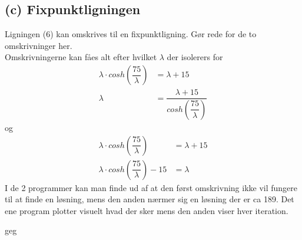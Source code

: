 \subsection*{(c) Fixpunktligningen}
 Ligningen (6) kan omskrives til en fixpunktligning. Gør rede for de to omskrivninger her.\\
Omskrivningerne kan fåes alt efter hvilket $\lambda$ der isolerers for
\begin{align*}
\lambda \cdot cosh(\dfrac{75}{\lambda})&=\lambda+15\\
\lambda&=\dfrac{\lambda+15}{cosh(\dfrac{75}{\lambda})}
\end{align*}
og
\begin{align*}
\lambda \cdot cosh(\dfrac{75}{\lambda})&=\lambda+15\\
\lambda \cdot cosh(\dfrac{75}{\lambda})-15 &=\lambda
\end{align*}
I de 2 programmer kan man finde ud af at den først omskrivning ikke vil fungere til at finde en løsning, mens den anden nærmer sig en løsning der er ca 189. Det ene program plotter visuelt hvad der sker mens den anden viser hver iteration.
\lstset{style=mystyle}

geg
\lstset{style=mystyle}
